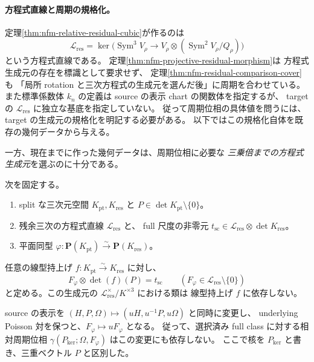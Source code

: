 \paragraph{方程式直線と周期の規格化。}
定理\ref{thm:nfm-relative-residual-cubic}が作るのは
\[
 \mathcal L_{\mathrm{res}}
 =\ker\bigl(\operatorname{Sym}^3 V_\rho
       \longrightarrow V_\rho\otimes(\operatorname{Sym}^2V_\rho/Q_\rho)\bigr)
\]
という方程式直線である。
定理\ref{thm:nfm-projective-residual-morphism}は
方程式生成元の存在を標識として要求せず、
定理\ref{thm:nfm-residual-comparison-cover}も
「局所 rotation と三次方程式の生成元を選んだ後」に周期を合わせている。
また標準係数体 $k_n$ の定義は source の表示 chart の関数体を指定するが、
target の $\mathcal L_{\mathrm{res}}$ に独立な基底を指定していない。
従って周期位相の具体値を問うには、target の生成元の規格化を明記する必要がある。
以下ではこの規格化自体を既存の幾何データから与える。

一方、現在までに作った幾何データは、周期位相に必要な
\emph{三乗倍までの方程式生成元}を選ぶのに十分である。

\begin{proposition}
\label{prop:nfm-period-equation-cube-frame}
次を固定する。
\begin{enumerate}[label=\textup{(\roman*)}]
\item split な三次元空間 $K_{\mathrm{pt}},K_{\mathrm{res}}$ と
      $P\in\det K_{\mathrm{pt}}\setminus\{0\}$。
\item 残余三次の方程式直線 $\mathcal L_{\mathrm{res}}$ と、
      full 尺度の非零元
      $t_{\mathrm{sc}}\in\mathcal L_{\mathrm{res}}\otimes\det K_{\mathrm{res}}$。
\item 平面同型
      $\varphi:\mathbf P(K_{\mathrm{pt}})\xrightarrow{\sim}
                      \mathbf P(K_{\mathrm{res}})$。
\end{enumerate}
任意の線型持上げ
$f:K_{\mathrm{pt}}\xrightarrow{\sim}K_{\mathrm{res}}$ に対し、
\begin{equation}\label{eq:nfm-period-cube-frame}
 F_\varphi\otimes\det(f)(P)=t_{\mathrm{sc}}
 \qquad(F_\varphi\in\mathcal L_{\mathrm{res}}\setminus\{0\})
\end{equation}
と定める。この生成元の
$\mathcal L_{\mathrm{res}}^{\times}/K^{\times3}$ における類は
線型持上げ $f$ に依存しない。

source の表示を
$(H,P,\Omega)\mapsto(uH,u^{-1}P,u\Omega)$ と同時に変更し、
underlying Poisson 対を保つと、$F_\varphi\mapsto uF_\varphi$ となる。
従って、選択済み full class に対する相対周期位相
$\gamma(P_{\mathrm{ker}};\Omega,F_\varphi)$ はこの変更にも依存しない。
ここで核を $P_{\mathrm{ker}}$ と書き、三重ベクトル $P$ と区別した。
\end{proposition}

